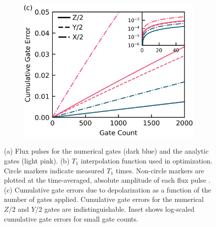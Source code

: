 \begin{figure}[ht]
\begin{subfigure}{.23\textwidth}
    \caption{\label{fig:longitudeb}}
  \end{subfigure}\hfill
  \begin{subfigure}{.4\textwidth}
    \includegraphics[width=\linewidth]{assets/f1c.png}
    \caption{\label{fig:longitudec}}
  \end{subfigure}
  \caption{
    (a) Flux pulses for the numerical gates (dark blue)
    and the analytic gates (light pink).
    (b) $T_{1}$ interpolation function used in optimization. Circle markers
    indicate measured $T_{1}$ times. Non-circle markers
    are plotted at the time-averaged, absolute amplitude of each flux pulse
    .
    (c) Cumulative gate errors due to depolarization as a function of the
    number of gates applied.
    Cumulative gate errors for the numerical $Z/2$ and $Y/2$ gates
    are indistinguishable. Inset shows log-scaled cumulative gate errors
    for small gate counts.
  }
  \label{fig:longitude}
\end{figure}

